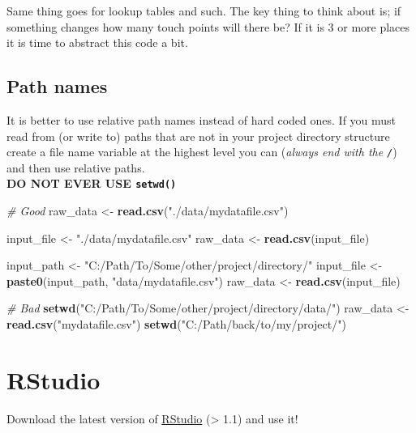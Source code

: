 \documentclass[]{book}
\newenvironment{Shaded}{\begin{snugshade}}{\end{snugshade}}
\newcommand{\KeywordTok}[1]{\textcolor[rgb]{0.13,0.29,0.53}{\textbf{#1}}}
\newcommand{\StringTok}[1]{\textcolor[rgb]{0.31,0.60,0.02}{#1}}
\newcommand{\CommentTok}[1]{\textcolor[rgb]{0.56,0.35,0.01}{\textit{#1}}}
\newcommand{\NormalTok}[1]{#1}
\theoremstyle{definition}
\theoremstyle{definition}
\theoremstyle{definition}
\theoremstyle{remark}
\begin{document}
Same thing goes for lookup tables and such. The key thing to think about
is; if something changes how many touch points will there be? If it is 3
or more places it is time to abstract this code a bit.

\subsection{Path names}\label{path-names}

It is better to use relative path names instead of hard coded ones. If
you must read from (or write to) paths that are not in your project
directory structure create a file name variable at the highest level you
can (\emph{always end with the \texttt{/}}) and then use relative
paths.\\
\textbf{DO NOT EVER USE \texttt{setwd()}}

\begin{Shaded}
\begin{Highlighting}[]
\CommentTok{# Good}
\NormalTok{raw_data <-}\StringTok{ }\KeywordTok{read.csv}\NormalTok{(}\StringTok{"./data/mydatafile.csv"}\NormalTok{) }

\NormalTok{input_file <-}\StringTok{ "./data/mydatafile.csv"}
\NormalTok{raw_data <-}\StringTok{ }\KeywordTok{read.csv}\NormalTok{(input_file)  }

\NormalTok{input_path <-}\StringTok{ "C:/Path/To/Some/other/project/directory/"}
\NormalTok{input_file <-}\StringTok{ }\KeywordTok{paste0}\NormalTok{(input_path, }\StringTok{"data/mydatafile.csv"}\NormalTok{)}
\NormalTok{raw_data <-}\StringTok{ }\KeywordTok{read.csv}\NormalTok{(input_file)}

\CommentTok{# Bad}
\KeywordTok{setwd}\NormalTok{(}\StringTok{"C:/Path/To/Some/other/project/directory/data/"}\NormalTok{)}
\NormalTok{raw_data <-}\StringTok{ }\KeywordTok{read.csv}\NormalTok{(}\StringTok{"mydatafile.csv"}\NormalTok{)}
\KeywordTok{setwd}\NormalTok{(}\StringTok{"C:/Path/back/to/my/project/"}\NormalTok{)}
\end{Highlighting}
\end{Shaded}

\section{RStudio}\label{rstudio}

Download the latest version of
\href{https://www.rstudio.com/products/rstudio/download/\#download}{RStudio}
(\textgreater{} 1.1) and use it!
\end{document}
